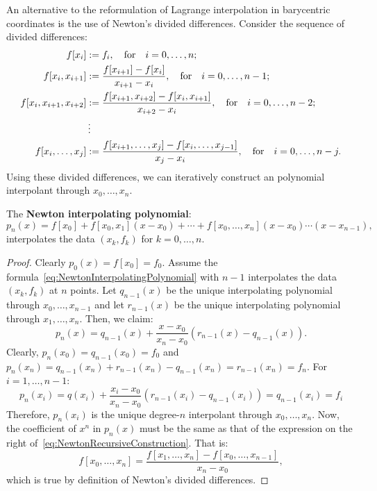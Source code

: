 An alternative to the reformulation of Lagrange interpolation in barycentric coordinates is the use of Newton's divided differences. Consider the sequence of divided differences:
\begin{align*}
f[x_i] & := f_i,\quad{\rm for}\quad i=0,\ldots,n;\\
f[x_i,x_{i+1}] & := \dfrac{f[x_{i+1}]-f[x_i]}{x_{i+1}-x_i},\quad{\rm for}\quad i=0,\ldots,n-1;\\
f[x_i,x_{i+1},x_{i+2}] & := \dfrac{f[x_{i+1},x_{i+2}]-f[x_i,x_{i+1}]}{x_{i+2}-x_i},\quad{\rm for}\quad i=0,\ldots,n-2;\\
& \vdots\\
f[x_i,\ldots,x_j] & := \dfrac{f[x_{i+1},\ldots,x_j]-f[x_i,\ldots,x_{j-1}]}{x_j-x_i},\quad{\rm for}\quad i=0,\ldots,n-j.
\end{align*}
Using these divided differences, we can iteratively construct an polynomial interpolant through $x_0,\ldots,x_n$.
\begin{theorem}
The {\bf Newton interpolating polynomial}:
\begin{equation}\label{eq:NewtonInterpolatingPolynomial}
p_n(x) = f[x_0] + f[x_0,x_1](x-x_0) + \cdots + f[x_0,\ldots,x_n](x-x_0)\cdots(x-x_{n-1}),
\end{equation}
interpolates the data $(x_k,f_k)$ for $k=0,\ldots,n$.
\end{theorem}
\begin{proof}
Clearly $p_0(x) = f[x_0] = f_0$. Assume the formula~\eqref{eq:NewtonInterpolatingPolynomial} with $n-1$ interpolates the data $(x_k,f_k)$ at $n$ points. Let $q_{n-1}(x)$ be the unique interpolating polynomial through $x_0,\ldots,x_{n-1}$ and let $r_{n-1}(x)$ be the unique interpolating polynomial through $x_1,\ldots,x_n$. Then, we claim:
\begin{equation}\label{eq:NewtonRecursiveConstruction}
p_n(x) = q_{n-1}(x) + \dfrac{x-x_0}{x_n-x_0}(r_{n-1}(x)-q_{n-1}(x)).
\end{equation}
Clearly, $p_n(x_0) = q_{n-1}(x_0) = f_0$ and $p_n(x_n) = q_{n-1}(x_n) + r_{n-1}(x_n) - q_{n-1}(x_n) = r_{n-1}(x_n) = f_n$. For $i = 1,\ldots,n-1$:
\[
p_n(x_i) = q(x_i) + \dfrac{x_i-x_0}{x_n-x_0}(r_{n-1}(x_i)-q_{n-1}(x_i)) = q_{n-1}(x_i) = f_i
\]
Therefore, $p_n(x_i)$ is the unique degree-$n$ interpolant through $x_0,\ldots,x_n$. Now, the coefficient of $x^n$ in $p_n(x)$ must be the same as that of the expression on the right of~\eqref{eq:NewtonRecursiveConstruction}. That is:
\[
f[x_0,\ldots,x_n] = \dfrac{f[x_1,\ldots,x_n]-f[x_0,\ldots,x_{n-1}]}{x_n-x_0},
\]
which is true by definition of Newton's divided differences.
\end{proof}

